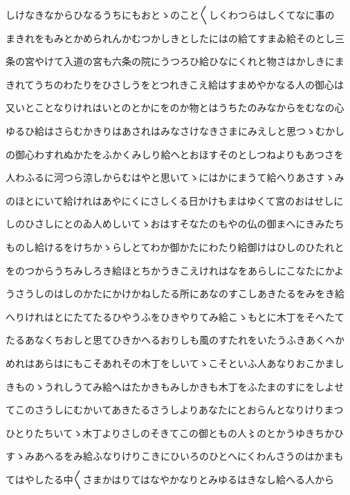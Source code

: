 \documentclass[a4paper,11pt,landscape]{ltjtarticle}
\begin{document}
\par\medskip
しけなきなからひなるうちにもおとゝのこと〱しくわつらはしくてなに事の
\par\medskip
まきれをもみとかめられんかむつかしきとしたにはの給てすまゐ給そのとし三
\par\medskip
条の宮やけて入道の宮も六条の院にうつろひ給ひなにくれと物さはかしきにま
\par\medskip
きれてうちのわたりをひさしうをとつれきこえ給はすまめやかなる人の御心は
\par\medskip
又いとことなりけれはいとのとかにをのか物とはうちたのみなからをむなの心
\par\medskip
ゆるひ給はさらむかきりはあされはみなさけなきさまにみえしと思つゝむかし
\par\medskip
の御心わすれぬかたをふかくみしり給へとおほすそのとしつねよりもあつさを
\par\medskip
人わふるに河つら涼しからむはやと思いてゝにはかにまうて給へりあさすゝみ
\par\medskip
のほとにいて給けれはあやにくにさしくる日かけもまはゆくて宮のおはせしに
\par\medskip
しのひさしにとのゐ人めしいてゝおはすそなたのもやの仏の御まへにきみたち
\par\medskip
ものし給けるをけちかゝらしとてわか御かたにわたり給御けはひしのひたれと
\par\medskip
をのつからうちみしろき給ほとちかうきこえけれはなをあらしにこなたにかよ
\par\medskip
うさうしのはしのかたにかけかねしたる所にあなのすこしあきたるをみをき給
\par\medskip
へりけれはとにたてたるひやうふをひきやりてみ給こゝもとに木丁をそへたて
\par\medskip
たるあなくちおしと思てひきかへるおりしも風のすたれをいたうふきあくへか
\par\medskip
めれはあらはにもこそあれその木丁をしいてゝこそといふ人あなりおこかまし
\par\medskip
きものゝうれしうてみ給へはたかきもみしかきも木丁をふたまのすにをしよせ
\par\medskip
てこのさうしにむかいてあきたるさうしよりあなたにとおらんとなりけりまつ
\par\medskip
ひとりたちいてゝ木丁よりさしのそきてこの御ともの人〻のとかうゆきちかひ
\par\medskip
すゝみあへるをみ給ふなりけりこきにひいろのひとへにくわんさうのはかまも
\par\medskip
てはやしたる中〱さまかはりてはなやかなりとみゆるはきなし給へる人から
\end{document}
